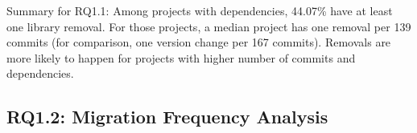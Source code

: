 \documentclass[sigconf, screen]{acmart}
\begin{document}

\begin{result-rq}{Summary for RQ1.1:}
Among projects with dependencies, 44.07\% have at least one library removal.
For those projects, a median project has one removal per 139 commits (for comparison, one version change per 167 commits).
Removals are more likely to happen for projects with higher number of commits and dependencies.
\end{result-rq}

\subsection{RQ1.2: Migration Frequency Analysis}
\label{sec:rq1.2}


\end{document}
